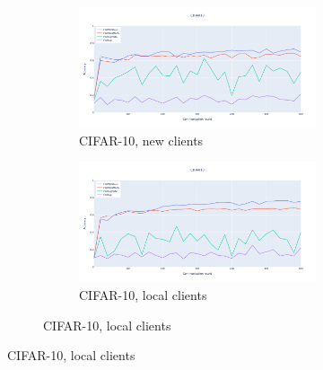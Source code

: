 \begin{figure}
    \centering
    \begin{subfigure}{\textwidth}
        \centering
        \begin{subfigure}{.5\textwidth}
            \centering
            \includegraphics[width=\linewidth]{./images/cifar_meta_new.png}
            \caption{CIFAR-10, new clients}
            \label{fig:cifar_meta_new}
        \end{subfigure}%
        \begin{subfigure}{.5\textwidth}
            \centering
            \includegraphics[width=\linewidth]{./images/cifar_meta_old.png}
            \caption{CIFAR-10, local clients}
            \label{fig:cifar_meta_old}
        \end{subfigure}
    \end{subfigure}


\end{figure}
